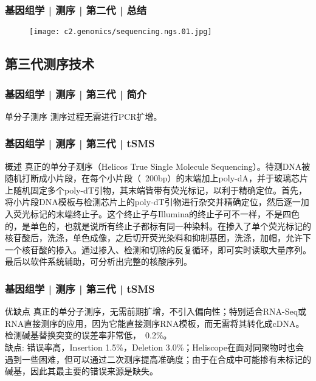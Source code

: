 

\begin{frame}
  \frametitle{基因组学 | 测序 | 第二代 | 总结}
  \begin{figure}
    \centering
    \texttt{[image: c2.genomics/sequencing.ngs.01.jpg]}
  \end{figure}
\end{frame}

\subsection{第三代测序技术}
\begin{frame}
  \frametitle{基因组学 | 测序 | 第三代 | 简介}
  \begin{block}{单分子测序}
测序过程无需进行PCR扩增。 
  \end{block}
\end{frame}

\begin{frame}
  \frametitle{基因组学 | 测序 | 第三代 | tSMS}
  \begin{block}{概述}
真正的单分子测序（Helicos True Single Molecule Sequencing）。待测DNA被随机打断成小片段，在每个小片段（~200bp）的末端加上poly-dA，并于玻璃芯片上随机固定多个poly-dT引物，其末端皆带有荧光标记，以利于精确定位。首先，将小片段DNA模板与检测芯片上的poly-dT引物进行杂交并精确定位，然后逐一加入荧光标记的末端终止子。这个终止子与Illumina的终止子可不一样，不是四色的，是单色的，也就是说所有终止子都标有同一种染料。在掺入了单个荧光标记的核苷酸后，洗涤，单色成像，之后切开荧光染料和抑制基团，洗涤，加帽，允许下一个核苷酸的掺入。通过掺入、检测和切除的反复循环，即可实时读取大量序列。最后以软件系统辅助，可分析出完整的核酸序列。
  \end{block}
\end{frame}

\begin{frame}
  \frametitle{基因组学 | 测序 | 第三代 | tSMS}
  \begin{block}{优缺点}
真正的单分子测序，无需前期扩增，不引入偏向性；特别适合RNA-Seq或RNA直接测序的应用，因为它能直接测序RNA模板，而无需将其转化成cDNA。检测碱基替换突变的误差率非常低，~0.2\%。\\
\vspace{1em}
缺点: 错误率高，Insertion 1.5\%，Deletion 3.0\%；Heliscope在面对同聚物时也会遇到一些困难，但可以通过二次测序提高准确度；由于在合成中可能掺有未标记的碱基，因此其最主要的错误来源是缺失。
  \end{block}
\end{frame}

